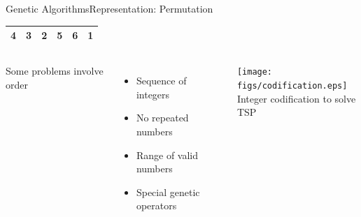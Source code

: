 \documentclass[10pt,compress]{beamer} %
\begin{document}
\begin{frame}{Genetic Algorithms}{Representation: Permutation}
	\vspace{-0.7cm}
	\begin{table}[]
	\centering
	\begin{tabular}{|l|l|l|l|l|l|}
	\hline
 	4 & 3 & 2 & 5 & 6 & 1 \\ \hline
	\end{tabular}
	\end{table}

	\vspace{-0.2cm}

    \begin{columns}
	Some problems involve order
	\begin{itemize}
		\item Sequence of integers
		\item No repeated numbers
		\item Range of valid numbers
		\item Special genetic operators
  	\end{itemize}
	\begin{center}
	\texttt{[image: figs/codification.eps]}\\
	\small{Integer codification to solve TSP}
	\end{center}
	\end{columns}
\end{frame}
\end{document}
